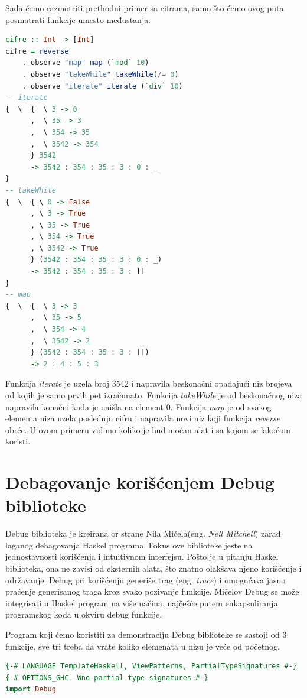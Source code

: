 \documentclass[a4paper]{article}
\begin{document}
{{Sada ćemo razmotriti prethodni primer sa ciframa, samo što ćemo ovog puta posmatrati funkcije umesto međustanja.
\begin{lstlisting}[language=Haskell]
cifre :: Int -> [Int]
cifre = reverse 
	. observe "map" map (`mod` 10)
	. observe "takeWhile" takeWhile(/= 0)
	. observe "iterate" iterate (`div` 10)
-- iterate 
{  \  {  \ 3 -> 0
      ,  \ 35 -> 3
      ,  \ 354 -> 35
      ,  \ 3542 -> 354
      } 3542
      -> 3542 : 354 : 35 : 3 : 0 : _
}
-- takeWhile
{  \  { \ 0 -> False
      , \ 3 -> True
      , \ 35 -> True
      , \ 354 -> True
      , \ 3542 -> True
      } (3542 : 354 : 35 : 3 : 0 : _)
      -> 3542 : 354 : 35 : 3 : []
}
-- map
{  \  {  \ 3 -> 3
      ,  \ 35 -> 5
      ,  \ 354 -> 4
      ,  \ 3542 -> 2  
      } (3542 : 354 : 35 : 3 : [])
      -> 2 : 4 : 5 : 3
\end{lstlisting}
Funkcija {\em iterate} je uzela broj 3542 i napravila beskonačni opadajući niz brojeva od kojih je samo prvih pet izračunato.
Funkcija {\em takeWhile} je od beskonačnog niza napravila konačni kada je naišla na element 0.
Funkcija {\em map} je od svakog elementa niza uzela poslednju cifru i napravila novi niz koji funkcija {\em reverse} obrće.
U ovom primeru vidimo koliko je hud moćan alat i sa kojom se lakoćom koristi.

\section{Debagovanje korišćenjem Debug biblioteke}
Debug biblioteka je kreirana or strane Nila Mičela(eng. {\em Neil Mitchell}) zarad laganog debagovanja Haskel programa\cite{mitchell-debug}. Fokus ove biblioteke jeste na jednostavnosti korišćenja i intuitivnom interfejsu. Pošto je u pitanju Haskel biblioteka, ona ne zavisi od eksternih alata, što znatno olakšava njeno korišćenje i održavanje. Debug pri korišćenju generiše trag (eng. {\em trace}) i omogućava jasno praćenje generisanog traga kroz svako pozivanje funkcije\cite{chitil2002transforming}.
Mičelov Debug se može integrisati u Haskel program na više načina, najčešće putem enkapsuliranja programskog koda u okviru debug funkcije\cite{mitchell-debug}.

Program koji ćemo koristiti za demonstraciju Debug biblioteke se sastoji od 3 funkcije, sve tri treba da vrate koliko elemenata u nizu je veće od početnog.

\begin{lstlisting}[caption={Okružujemo naš kod funkcijom debug, iz biblioteke Debug, sa uključivanjem ekstenzija navedenih u prvom redu}, language=Haskell]
{-# LANGUAGE TemplateHaskell, ViewPatterns, PartialTypeSignatures #-}
{-# OPTIONS_GHC -Wno-partial-type-signatures #-}
import Debug


\end{lstlisting}}}
\end{document}

